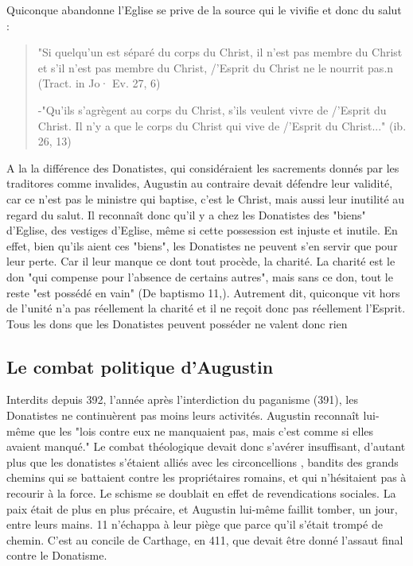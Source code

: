 Quiconque abandonne l'Eglise se prive de la source qui le vivifie et donc du salut :
\begin{quote}
    "Si quelqu'un est séparé du corps du Christ, il n'est pas membre du Christ et s'il n'est pas membre du Christ, /'Esprit du Christ ne le nourrit pas.n  (Tract. in Jo· Ev. 27, 6)
    
    -"Qu'ils s'agrègent au corps du Christ, s'ils veulent vivre de /'Esprit du Christ. Il n'y a que le corps du Christ qui vive de /'Esprit du Christ..." (ib. 26, 13)

\end{quote}

A la la différence des Donatistes, qui considéraient les sacrements donnés par les traditores comme invalides, Augustin au contraire devait défendre leur validité, car ce n'est pas le ministre qui baptise, c'est le Christ, mais aussi leur inutilité au regard du salut. Il reconnaît donc qu'il y a chez les Donatistes des "biens" d'Eglise, des vestiges d'Eglise, même si cette possession est injuste et inutile. En effet, bien qu'ils aient ces "biens", les Donatistes ne peuvent s'en servir que pour leur perte. Car il leur manque ce dont tout procède, la charité. La charité est le don "qui compense pour l'absence de certains autres", mais sans ce don, tout le reste "est possédé en vain" (De baptismo 11,). Autrement dit, quiconque vit hors de l'unité n'a pas réellement la charité et il ne reçoit donc pas réellement l'Esprit. Tous les dons que les Donatistes peuvent posséder
ne valent donc rien



 \subsection{Le  combat  politique  d'Augustin}
 
 
Interdits depuis 392,	l'année après l'interdiction du	paganisme (391), les Donatistes ne continuèrent pas moins leurs activités. Augustin reconnaît lui-même que les "lois contre eux ne manquaient pas, mais c'est comme si elles avaient manqué."  Le combat théologique devait donc s'avérer insuffisant, d'autant plus que les donatistes s'étaient alliés avec les circoncellions , bandits des grands chemins qui se battaient contre les propriétaires romains, et qui n'hésitaient pas à recourir à la force. Le schisme se doublait en effet de revendications sociales. La paix était de plus en plus précaire, et Augustin lui-même	faillit tomber, un jour, entre leurs mains. 11 n'échappa à leur piège que parce qu'il s'était trompé de chemin. C'est au concile de Carthage, en 411, que devait être donné l'assaut final contre le Donatisme.

